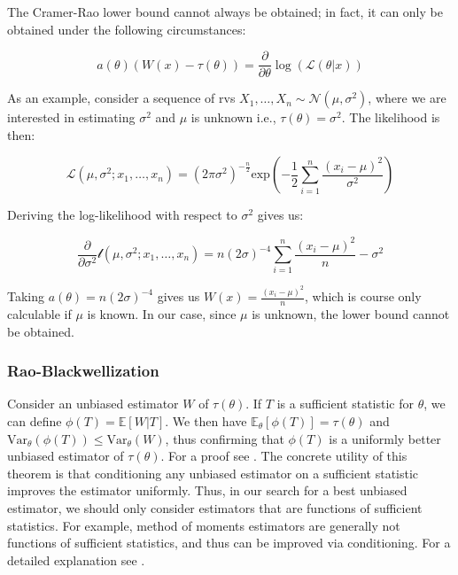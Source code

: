 \documentclass{report}
\begin{document}
The Cramer-Rao lower bound cannot always be obtained; in fact, it can only be obtained under the following circumstances:

\begin{equation}\label{eq:cramer-rao-attainment}
    a(\theta) \left(W(x) - \tau(\theta)\right) = \frac{\partial}{\partial\theta} \log\left(\mathcal{L}(\theta|x)\right)
\end{equation}

As an example, consider a sequence of \glspl{rv} $X_1, \dots, X_n \sim \mathcal{N}(\mu, \sigma^2)$, where we are interested in estimating $\sigma^2$ and $\mu$ is unknown i.e., $\tau(\theta) = \sigma^2$. The likelihood is then:

\begin{equation}\label{eq:normal-likelihood}
    \mathcal{L}(\mu, \sigma^2; x_1, \dots, x_n) = (2\pi\sigma^2)^{-\frac{n}{2}} \text{exp}\left(-\frac{1}{2}\sum_{i=1}^n \frac{(x_i - \mu)^2}{\sigma^2}\right)
\end{equation}

Deriving the log-likelihood with respect to $\sigma^2$ gives us:

\begin{equation}\label{eq:normal-log-likelihood-derived}
    \frac{\partial}{\partial\sigma^2} \mathcal{l}(\mu, \sigma^2; x_1, \dots, x_n) = n(2\sigma)^{-4} \sum_{i=1}^n \frac{(x_i - \mu)^2}{n} - \sigma^2
\end{equation}

Taking $a(\theta) = n(2\sigma)^{-4}$ gives us $W(x) = \frac{(x_i - \mu)^2}{n}$, which is course only calculable if $\mu$ is known. In our case, since $\mu$ is unknown, the lower bound cannot be obtained. 

\subsubsection{Rao-Blackwellization}

Consider an unbiased estimator $W$ of $\tau(\theta)$. If $T$ is a sufficient statistic for $\theta$, we can define $\phi(T) = \mathbb{E}[W|T]$. We then have $\mathbb{E}_\theta[\phi(T)] = \tau(\theta)$ and $\text{Var}_\theta(\phi(T)) \leq \text{Var}_\theta(W)$, thus confirming that $\phi(T)$ is a uniformly better unbiased estimator of $\tau(\theta)$. For a proof see \cite[Chapter~7.3.3]{casella_statistical_2002}. The concrete utility of this theorem is that conditioning any unbiased estimator on a sufficient statistic improves the estimator uniformly. Thus, in our search for a best unbiased estimator, we should only consider estimators that are functions of sufficient statistics. For example, method of moments estimators are generally not functions of sufficient statistics, and thus can be improved via conditioning. For a detailed explanation see \cite[Chapter~7.5.1]{casella_statistical_2002}.
\end{document}
